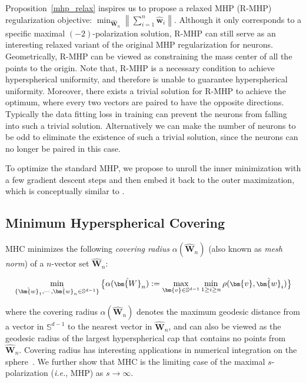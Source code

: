 Proposition~\ref{mhp_relax} inspires us to propose a relaxed MHP (R-MHP) regularization objective:  $\min_{\hat{\bm{W}}_n}\left\lVert\sum_{i=1}^n\hat{\bm{w}}_i\right\rVert$. Although it only corresponds to a specific maximal $(-2)$-polarization solution, R-MHP can still serve as an interesting relaxed variant of the original MHP regularization for neurons. Geometrically, R-MHP can be viewed as constraining the mass center of all the points to the origin. Note that, R-MHP is a necessary condition to achieve hyperspherical uniformity, and therefore is unable to guarantee hyperspherical uniformity. Moreover, there exists a trivial solution for R-MHP to achieve the optimum, where every two vectors are paired to have the opposite directions. Typically the data fitting loss in training can prevent the neurons from falling into such a trivial solution. Alternatively we can make the number of neurons to be odd to eliminate the existence of such a trivial solution, since the neurons can no longer be paired in this case.

To optimize the standard MHP, we propose to unroll the inner minimization with a few gradient descent steps and then embed it back to the outer maximization, which is conceptually similar to \cite{dai2018coupled,finn2017model,monga2019algorithm,andrychowicz2016learning}.

\subsection{Minimum Hyperspherical Covering}

MHC minimizes the following \emph{covering radius} $\alpha(\hat{\bm{W}}_n)$ (also known as \emph{mesh norm}) of a $n$-vector set $\hat{\bm{W}}_n$:

\begin{equation}\label{eq_mhc}
\footnotesize
    \min_{\{\hat{\bm{w}}_1,\cdots,\hat{\bm{w}}_n\in\mathbb{S}^{d-1}\}}\big{\{}\alpha(\hat{\bm{W}}_n):=\max_{\bm{v}\in\mathbb{S}^{d-1}}\min_{1\geq i\geq n}\rho(\bm{v},\hat{\bm{w}}_i)\big{\}}
\end{equation}

where the covering radius $\alpha(\hat{\bm{W}}_n)$ denotes the maximum geodesic distance from a vector in $\mathbb{S}^{d-1}$ to the nearest vector in $\hat{\bm{W}}_n$, and can also be viewed as the geodesic radius of the largest hyperspherical cap that contains no points from $\hat{\bm{W}}_n$. Covering radius has interesting applications in numerical integration on the sphere~\cite{sloan2004extremal}. We further show that MHC is the limiting case of the maximal $s$-polarization (\emph{i.e.}, MHP) as $s\rightarrow\infty$.

